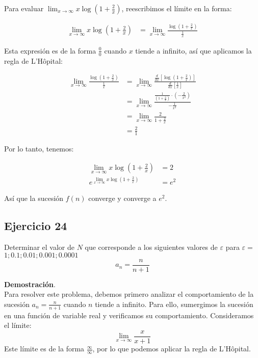 \documentclass{article}
\begin{document}
    Para evaluar \( \lim_{x \rightarrow \infty} x \log \left(1+\frac{2}{x}\right) \), reescribimos el límite en la forma:

    \begin{align*}
    \lim_{x \rightarrow \infty} x \log \left(1+\frac{2}{x}\right) &= \lim_{x \rightarrow \infty} \frac{\log \left(1+\frac{2}{x}\right)}{\frac{1}{x}}
    \end{align*}

    Esta expresión es de la forma \( \frac{0}{0} \) cuando \( x \) tiende a infinito, así que aplicamos la regla de L'Hôpital:

    \begin{align*}
    \lim_{x \rightarrow \infty} \frac{\log \left(1+\frac{2}{x}\right)}{\frac{1}{x}} &= \lim_{x \rightarrow \infty} \frac{\frac{d}{dx} \left[\log \left(1+\frac{2}{x}\right)\right]}{\frac{d}{dx} \left[\frac{1}{x}\right]} \\
    &= \lim_{x \rightarrow \infty} \frac{\frac{1}{\left(1+\frac{2}{x}\right)} \cdot \left(-\frac{2}{x^2}\right)}{-\frac{1}{x^2}} \\
    &= \lim_{x \rightarrow \infty} \frac{2}{1+\frac{2}{x}} \\
    &= \frac{2}{1}
    \end{align*}

    Por lo tanto, tenemos:

    \begin{align*}
    \lim_{x \rightarrow \infty} x \log \left(1+\frac{2}{x}\right) &= 2 \\
    e^{\lim_{x \rightarrow \infty} x \log \left(1+\frac{2}{x}\right)} &= e^2
    \end{align*}

    Así que la sucesión \( f(n) \) converge y converge a \( e^2 \).

    \subsection*{Ejercicio 24}
    Determinar el valor de $N$ que corresponde a los siguientes valores de $\varepsilon$ para $\varepsilon=$ $1 ; 0.1 ; 0.01 ; 0.001 ; 0.0001$
    $$
    a_{n}=\frac{n}{n+1}
    $$

    \textbf{Demostración}.\\

    Para resolver este problema, debemos primero analizar el comportamiento de la sucesión $a_n = \frac{n}{n+1}$ cuando $n$ tiende a infinito. Para ello, sumergimos la sucesión en una función de variable real y verificamos su comportamiento. Consideramos el límite:
    \[
    \lim _{x \rightarrow \infty} \frac{x}{x+1}
    \]
    Este límite es de la forma $\frac{\infty}{\infty}$, por lo que podemos aplicar la regla de L'Hôpital.
\end{document}
